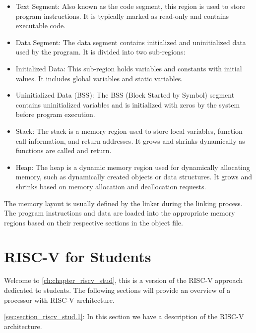             \begin{itemize}
            \item Text Segment: Also known as the code segment, this region is used to store program instructions. It is typically marked as read-only and contains executable code.
            
            \item Data Segment: The data segment contains initialized and uninitialized data used by the program. It is divided into two sub-regions:
            
            \item Initialized Data: This sub-region holds variables and constants with initial values. It includes global variables and static variables.
            
            \item Uninitialized Data (BSS): The BSS (Block Started by Symbol) segment contains uninitialized variables and is initialized with zeros by the system before program execution.
            
            \item Stack: The stack is a memory region used to store local variables, function call information, and return addresses. It grows and shrinks dynamically as functions are called and return.
            
            \item Heap: The heap is a dynamic memory region used for dynamically allocating memory, such as dynamically created objects or data structures. It grows and shrinks based on memory allocation and deallocation requests.
            
            \end{itemize}
            
            The memory layout is usually defined by the linker during the linking process. The program instructions and data are loaded into the appropriate memory regions based on their respective sections in the object file.

        
\chapter{RISC-V for Students} \label{ch:chapter_riscv_stud}
    Welcome to \autoref{ch:chapter_riscv_stud}, this is a version of the RISC-V approach dedicated to students. 
    The following sections will provide an overview of a processor with RISC-V architecture.

    \autoref{sec:section_riscv_stud.1}: In this section we have a description of the RISC-V architecture.

